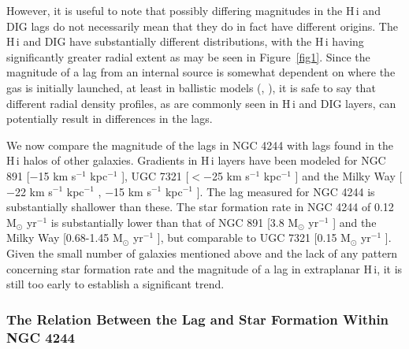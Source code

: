 \documentclass{emulateapj}
\begin{document}
\par
     However, it is useful to note that possibly differing magnitudes in the {\sc H\,i} and DIG lags do not necessarily mean that they do in fact have different origins.  The {\sc H\,i} and DIG have substantially different distributions, with the {\sc H\,i} having significantly greater radial extent as may be seen in Figure~\ref{fig1}.  Since the magnitude of a lag from an internal source is somewhat dependent on where the gas is initially launched, at least in ballistic models (\citealt{2002ApJ...578...98C}, \citealt{2006MNRAS.366..449F}), it is safe to say that different radial density profiles, as are commonly seen in {\sc H\,i} and DIG layers, can potentially result in differences in the lags.
     
\par
     We now compare the magnitude of the lags in NGC 4244 with lags found in the {\sc H\,i} halos of other galaxies.  Gradients in {\sc H\,i} layers have been modeled for NGC 891 [$-$15 km s$^{-1}$ kpc$^{-1}$ \citep{2007AJ....134.1019O}], UGC 7321 [$<-$25 km s$^{-1}$ kpc$^{-1}$ \citep{2003ApJ...593..721M}] and the Milky Way [$-$22 km s$^{-1}$ kpc$^{-1}$ \citep{2008ApJ...679.1288L}, $-$15 km s$^{-1}$ kpc$^{-1}$ \citep{2010arXiv1010.3563M}].  The lag measured for NGC 4244 is substantially shallower than these.  The star formation rate in NGC 4244 of 0.12 M$_{\odot}$ yr$^{-1}$ is substantially lower than that of NGC 891 [3.8 M$_{\odot}$ yr$^{-1}$ \citep{2007AJ....134.1019O}] and the Milky Way [0.68-1.45 M$_{\odot}$ yr$^{-1}$ \citep{2010ApJ...710L..11R}], but comparable to UGC 7321 [0.15 M$_{\odot}$ yr$^{-1}$ \citep{2011A&A...526A.118H}].  Given the small number of galaxies mentioned above and the lack of any pattern concerning star formation rate and the magnitude of a lag in extraplanar {\sc H\,i}, it is still too early to establish a significant trend.


\subsubsection{The Relation Between the Lag and Star Formation Within NGC 4244}\label{Section6.2.1}
\end{document}
